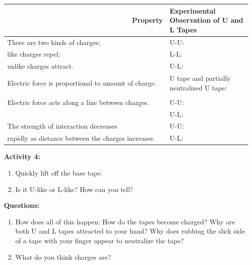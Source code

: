 \vspace{0.3cm}
{\centering \begin{tabular}{|l|l|}
\hline 
~~~~~~~~~~~~~~~~~~~~~~~~~~~~~~~~\textbf{Property}&
\textbf{Experimental Observation of U and L Tapes}\\
\hline
\hline 
There are two kinds of charges;&
U-U:\\
like charges repel;&
L-L:\\
unlike charges attract.&
U-L:\\
\hline 
Electric force is proportional to amount of charge.&
U tape and partially neutralized U tape:\\
&
\\
\hline 
Electric force acts along a line between charges.&
U-U:\\
&
U-L:\\
\hline 
The strength of interaction decreases&
U-U:\\
rapidly as distance between the charges increases.&
U-L:\\
\hline
\end{tabular}\par}
\vspace{0.3cm}

\textbf{Activity 4:}

\begin{enumerate}
\item Quickly lift off the base tape.
\item Is it U-like or L-like? How can you tell?\vspace{15mm}

\end{enumerate}
\textbf{Questions:}

\begin{enumerate}
\item How does all of this happen: How do the tapes become charged? Why
are both U and L tapes attracted to your hand? Why does rubbing the
slick side of a tape with your finger appear to neutralize the tape?\vspace{20mm}

\item What do you think charges are?\vspace{15mm}
\end{enumerate}

